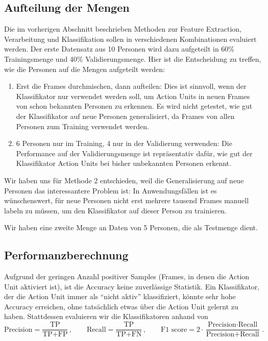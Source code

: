 \subsection{Aufteilung der Mengen}
Die im vorherigen Abschnitt beschrieben Methoden zur Feature Extraction,
Verarbeitung und Klassifikation sollen in verschiedenen Kombinationen evaluiert
werden. Der erste Datensatz aus 10 Personen wird dazu aufgeteilt in 60\%
Trainingsmenge und 40\% Validierungsmenge. Hier ist die Entscheidung zu treffen,
wie die Personen auf die Mengen aufgeteilt werden:
\begin{enumerate}
\item Erst die Frames durchmischen, dann aufteilen: Dies ist sinnvoll, wenn der
  Klassifikator nur verwendet werden soll, um Action Units in neuen Frames von schon bekannten
  Personen zu erkennen. Es wird nicht getestet, wie gut der Klassifikator auf
  neue Personen generalisiert, da Frames von allen Personen zum Training verwendet werden.
  \item 6 Personen nur im Training, 4 nur in der Validierung verwenden: Die
    Performance auf der Validierungsmenge ist repräsentativ dafür, wie gut der
    Klassifikator Action Units bei bisher unbekannten Personen erkennt.
\end{enumerate}
Wir haben uns für Methode 2 entschieden, weil
die Generalisierung auf neue Personen das interessantere Problem ist: In
Anwendungsfällen ist es wünschenswert, für neue Personen nicht erst mehrere
tausend Frames manuell labeln zu müssen, um den Klassifikator auf dieser Person
zu trainieren.

Wir haben eine zweite Menge an Daten von 5 Personen, die als Testmenge dient.
\subsection{Performanzberechnung}
Aufgrund der geringen Anzahl positiver Samples (Frames, in denen die Action Unit
aktiviert ist), ist die Accuracy keine zuverlässige Statistik. Ein Klassifikator,
der die Action Unit immer als "`nicht aktiv"' klassifiziert, könnte sehr hohe
Accuracy erreichen, ohne tatsächlich etwas über die Action Unit gelernt zu haben.
Stattdessen evaluieren wir die Klassifikatoren anhand von
\begin{equation*}
  \text{Precision}=\frac{\text{TP}}{\text{TP}+\text{FP}}\,, \qquad \text{Recall}=\frac{\text{TP}}{\text{TP}+\text{FN}}\,, \qquad \text{F1 score}=2\cdot\frac{\text{Precision}\cdot\text{Recall}}{\text{Precision}+\text{Recall}}\,.
\end{equation*}

